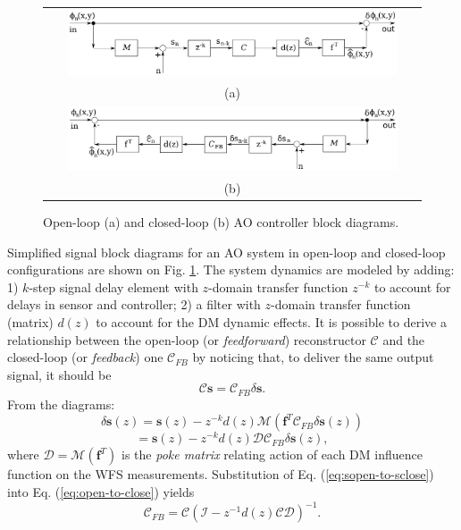 \begin{figure}[htp]
\begin{center}
\begin{tabular}{c}
 \includegraphics[width = 0.9\textwidth]{Forward.png} \\
 (a) \\
 \includegraphics[width = 0.9\textwidth]{Back.png} \\
 (b) \\
\end{tabular}
\end{center}
\caption{Open-loop (a) and closed-loop (b) AO controller block diagrams.}
\label{fig:forward-back}
\end{figure}

Simplified signal block diagrams for an AO system in open-loop and closed-loop
configurations are shown on Fig. \ref{fig:forward-back}.
The system dynamics are modeled by adding: 1)
$k$-step signal delay element with $z$-domain transfer function $z^{-k}$ to
account for delays in sensor and controller; 2) a filter with $z$-domain
transfer function (matrix) $d(z)$ to account for the DM dynamic
effects. It is possible to derive a relationship between the open-loop (or
\emph{feedforward})
reconstructor $\mathcal{C}$ and the closed-loop (or \emph{feedback}) one
$\mathcal{C}_{FB}$ by noticing that, to deliver the same output signal, it
should be
\begin{equation} \label{eq:open-to-close}
  \mathcal{C} \bm{s} = \mathcal{C}_{FB} \delta \bm{s}.
\end{equation}
From the diagrams:
\begin{equation} \label{eq:sopen-to-sclose}
	\delta \bm{s}(z) = \bm{s}(z) - z^{-k} d(z) \mathcal{M} ( \bm{f}^{T}
	\mathcal{C}_{FB} \delta \bm{s}(z) )
\end{equation}
$$
  = \bm{s}(z) - z^{-k} d(z) \mathcal{DC}_{FB} \delta \bm{s}(z),
$$
where $\mathcal{D} = \mathcal{M} (\bm{f}^{T})$ is the \emph{poke matrix}
relating action of each DM influence function on the WFS measurements.
Substitution of Eq. (\ref{eq:sopen-to-sclose}) into Eq.
(\ref{eq:open-to-close}) yields
\begin{equation} \label{eq:fw-to-fb}
	\mathcal{C}_{FB} = \mathcal{C}
	( \mathcal{I} - z^{-1} d(z) \mathcal{CD} )^{-1}.
\end{equation}

